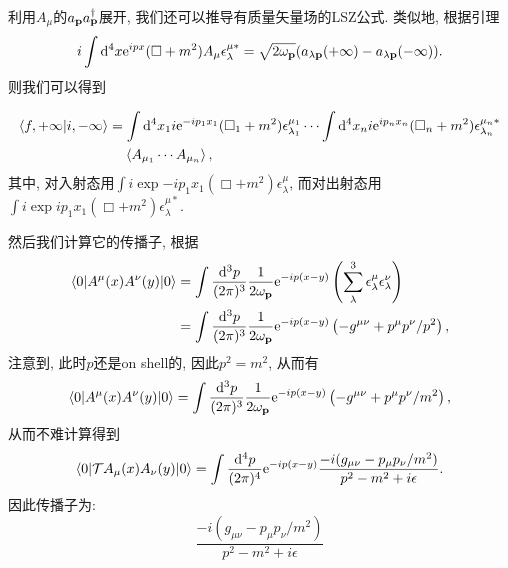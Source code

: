 利用$A_\mu$的$a_{\mathbf{p}}a_{\mathbf{p}}^\dagger$展开, 我们还可以推导有质量矢量场的LSZ公式. 类似地, 根据引理
\begin{align}
    i\int\mathrm d^4x\mathrm e^{ipx}(\Box+m^2)A_\mu\epsilon_\lambda^{\mu*}=\sqrt{2\omega_{\mathbf{p}}}(a_{\lambda\mathbf{p}}(+\infty)-a_{\lambda\mathbf{p}}(-\infty)).
\end{align}
则我们可以得到
\begin{theorem}\label{LSZformula-massive-vector}
    \begin{align}
        \braket{f, +\infty|i, -\infty}&=\int\mathrm d^4x_1 i\mathrm e^{-ip_1x_1}(\Box_1+m^2)\epsilon^{\mu_1}_{\lambda_1}\cdots\int\mathrm d^4x_n i\mathrm e^{ip_nx_n}(\Box_n+m^2)\epsilon^{\mu_n*}_{\lambda_n}\notag\\
        &\;\;\;\;\braket{A_{\mu_1}\cdots A_{\mu_n}},
    \end{align}
    其中, 对入射态用$\int i\exp{-ip_1x_1}(\Box+m^2)\epsilon^\mu_\lambda$, 而对出射态用$\int i\exp{ip_1x_1}(\Box+m^2)\epsilon^{\mu*}_\lambda$.
\end{theorem}



然后我们计算它的传播子, 根据
\begin{align}
    \braket{0|A^\mu(x)A^\nu(y)|0}&=\int\ld p\exp{-ip(x-y)}\left(\sum_\lambda^3\epsilon^\mu_\lambda\epsilon^\nu_\lambda\right)\\
    &=\int\ld p\exp{-ip(x-y)}\left(-g^{\mu\nu}+p^\mu p^\nu/p^2\right),
\end{align}
注意到, 此时$p$还是on shell的, 因此$p^2=m^2$, 从而有
\begin{equation}
    \braket{0|A^\mu(x)A^\nu(y)|0}=\int\ld p\exp{-ip(x-y)}\left(-g^{\mu\nu}+p^\mu p^\nu/m^2\right),
\end{equation}
从而不难计算得到
\begin{equation}
    \braket{0|\mathcal TA_\mu(x)A_\nu(y)|0}=\int\frac{\mathrm d^4p}{(2\pi)^4}\mathrm e^{-ip(x-y)}\frac{-i(g_{\mu\nu}-p_\mu p_\nu/m^2)}{p^2-m^2+i\epsilon}.
\end{equation}
因此传播子为:
\begin{equation}
    \frac{-i(g_{\mu\nu}-p_\mu p_\nu/m^2)}{p^2-m^2+i\epsilon}
\end{equation}

